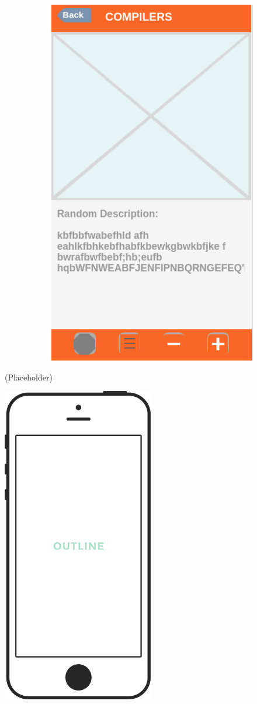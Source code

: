 \documentclass{article}
\begin{document}
\begin{figure}[ht]
\begin{subfigure}{}
			\includegraphics[scale=0.3]{fluidcard.png}
	\end{subfigure}
\end{figure}

(Placeholder)
\begin{center}
	\vspace{1mm}
	\includegraphics[scale=0.2]{placeholder.png}
	\vspace{1mm}
\end{center}
\end{document}
